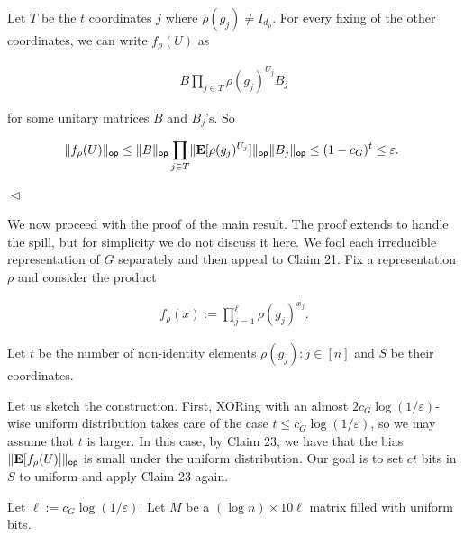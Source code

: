 Let $T$ be the $t$ coordinates $j$ where $\rho(g_{j})\neq I_{d_{\rho}}$.
For every fixing of the other coordinates, we can write $f_{\rho}(U)$ as\par


\[\begin{gathered}
B\prod_{j\in T}\rho(g_{j})^{U_{j}}B_{j}
\end{gathered}\]


for some unitary matrices $B$ and $B_{j}$’s.
So\par


\[\begin{gathered}
\lVert f_{\rho}(U)\rVert_{\mathsf{op}}\leq\lVert B\rVert_{\mathsf{op}}\prod_{j\in T}\lVert\mathop{\bf E\/}[\rho(g_{j})^{U_{j}}]\rVert_{\mathsf{op}}\lVert B_{j}\rVert_{\mathsf{op}}\leq(1-c_{G})^{t}\leq\varepsilon.\
\end{gathered}\]


$\vartriangleleft$\par




We now proceed with the proof of the main result. The proof extends to handle the spill, but for simplicity we do not discuss it here. We fool each irreducible representation of $G$ separately and then appeal to Claim 21.
Fix a representation $\rho$ and consider the product\par


\[\begin{gathered}
f_{\rho}(x):=\prod_{j=1}^{\ell}\rho(g_{j})^{x_{j}}.
\end{gathered}\]


Let $t$ be the number of non-identity elements $\rho(g_{j}):j\in[n]$ and $S$ be their coordinates.\par




Let us sketch the construction.
First, XORing with an almost $2c_{G}\log(1/\varepsilon)$-wise uniform distribution takes care of the case $t\leq c_{G}\log(1/\varepsilon)$, so we may assume that $t$ is larger.
In this case, by Claim 23, we have that the bias $\lVert\mathop{\bf E\/}[f_{\rho}(U)]\rVert_{\mathsf{op}}$ is small under the uniform distribution.
Our goal is to set $ct$ bits in $S$ to uniform and apply Claim 23 again.\par




Let $\ell:=c_{G}\log(1/\varepsilon)$.
Let $M$ be a $(\log n)\times 10\ell$ matrix filled with uniform bits.\par




